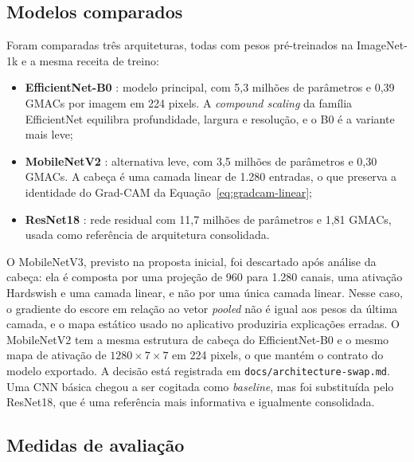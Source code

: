 \documentclass[11pt,a4paper]{article}
\begin{document}
	\subsection{Modelos comparados}
	\label{sec:modelos}
	
	Foram comparadas três arquiteturas, todas com pesos pré-treinados na ImageNet-1k e a mesma receita de treino:
	\begin{itemize}
		\item \textbf{EfficientNet-B0} \cite{tan2019}: modelo principal, com 5,3 milhões de parâmetros e 0,39 GMACs por imagem em 224 pixels. A \emph{compound scaling} da família EfficientNet equilibra profundidade, largura e resolução, e o B0 é a variante mais leve;
		\item \textbf{MobileNetV2} \cite{sandler2018}: alternativa leve, com 3,5 milhões de parâmetros e 0,30 GMACs. A cabeça é uma camada linear de 1.280 entradas, o que preserva a identidade do Grad-CAM da Equação~\eqref{eq:gradcam-linear};
		\item \textbf{ResNet18} \cite{he2016}: rede residual com 11,7 milhões de parâmetros e 1,81 GMACs, usada como referência de arquitetura consolidada.
	\end{itemize}
	
	O MobileNetV3, previsto na proposta inicial, foi descartado após análise da cabeça: ela é composta por uma projeção de 960 para 1.280 canais, uma ativação Hardswish e uma camada linear, e não por uma única camada linear. Nesse caso, o gradiente do escore em relação ao vetor \emph{pooled} não é igual aos pesos da última camada, e o mapa estático usado no aplicativo produziria explicações erradas. O MobileNetV2 tem a mesma estrutura de cabeça do EfficientNet-B0 e o mesmo mapa de ativação de $1280 \times 7 \times 7$ em 224 pixels, o que mantém o contrato do modelo exportado. A decisão está registrada em \texttt{docs/architecture-swap.md}. Uma CNN básica chegou a ser cogitada como \emph{baseline}, mas foi substituída pelo ResNet18, que é uma referência mais informativa e igualmente consolidada.
	
	\subsection{Medidas de avaliação}
	\label{sec:metricas}
	
\end{document}
